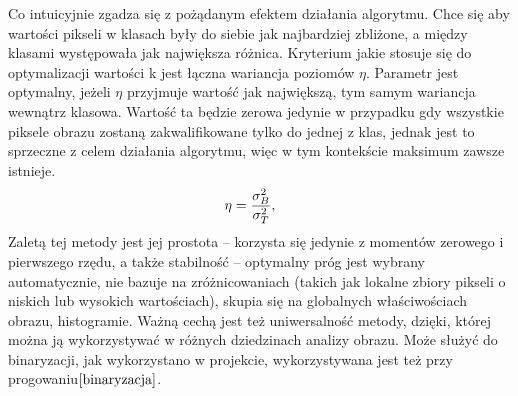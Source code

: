 \documentclass[eng,oneside]{mgr}
\begin{document}
\hspace{1cm} Co intuicyjnie zgadza się z pożądanym efektem działania algorytmu. Chce się aby wartości pikseli w klasach były do siebie jak najbardziej zbliżone, a między klasami występowała jak największa różnica.
Kryterium jakie stosuje się do optymalizacji wartości k jest łączna wariancja poziomów $\eta$. Parametr jest optymalny, jeżeli $\eta$ przyjmuje wartość jak największą, tym samym wariancja wewnątrz klasowa. Wartość ta będzie zerowa jedynie w przypadku gdy wszystkie piksele obrazu zostaną zakwalifikowane tylko do jednej z klas, jednak jest to sprzeczne z celem działania algorytmu, więc w tym kontekście maksimum zawsze istnieje.
\begin{equation}
\eta=\frac{\sigma_B^2}{\sigma_T^2}, \hspace{0.5cm} 
\end{equation}
\hspace{1cm}Zaletą tej metody jest jej prostota – korzysta się jedynie z momentów zerowego i pierwszego rzędu, a także stabilność – optymalny próg jest wybrany automatycznie, nie bazuje na zróżnicowaniach (takich jak lokalne zbiory pikseli o niskich lub wysokich wartościach), skupia się na globalnych właściwościach obrazu, histogramie. Ważną cechą jest też uniwersalność metody, dzięki, której można ją wykorzystywać w różnych dziedzinach analizy obrazu. Może służyć do binaryzacji, jak wykorzystano w projekcie, wykorzystywana jest też przy progowaniu$\cite{binaryzacja}$.
\end{document}
